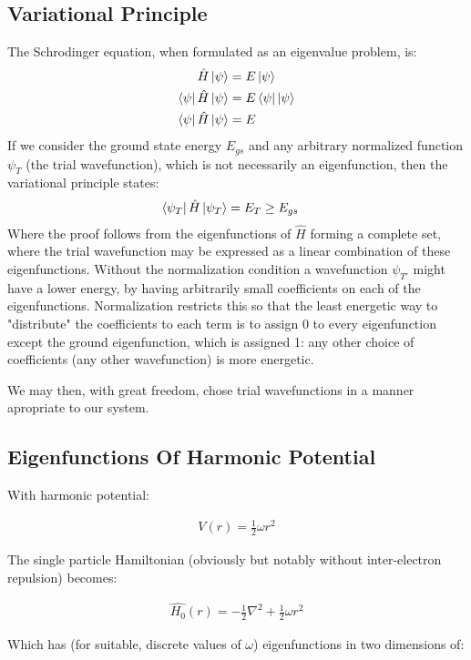 \documentclass[11pt, conference, compsocconf]{IEEEtran}
\begin{document}
\subsection{Variational Principle}
The Schrodinger equation, when formulated as an eigenvalue problem, is:
\begin{align}\hat{H}\ket{\psi} &= E\ket{\psi}\\
\bra{\psi}\hat{H}\ket{\psi} &= E\bra{\psi}\ket{\psi}\\
\bra{\psi}\hat{H}\ket{\psi} &= E
\end{align}
If we consider the ground state energy $E_{gs}$ and any arbitrary normalized function $\psi_{T}$ (the trial wavefunction), which is not necessarily an eigenfunction, then the variational principle states:
\begin{align}\bra{\psi_{T}}\hat{H}\ket{\psi_{T}} &= E_T \geq E_{gs}\end{align}
Where the proof follows from the eigenfunctions of $\hat{H}$ forming a complete set, where the trial wavefunction may be expressed as a linear combination of these eigenfunctions. Without the normalization condition a wavefunction $\psi_{T'}$ might have a lower energy, by having arbitrarily small coefficients on each of the eigenfunctions. Normalization restricts this so that the least energetic way to "distribute" the coefficients to each term is to assign 0 to every eigenfunction except the ground eigenfunction, which is assigned 1: any other choice of coefficients (any other wavefunction) is more energetic.

We may then, with great freedom, chose trial wavefunctions in a manner apropriate to our system.

\subsection{Eigenfunctions Of Harmonic Potential}
With harmonic potential: 

\begin{align}V\left(r\right)=\frac{1}{2}\omega r^2\end{align} 

The single particle Hamiltonian (obviously but notably without inter-electron repulsion) becomes: 

\begin{align}\hat{H_0} \left(r\right)=-\frac{1}{2}\nabla^2 + \frac{1}{2}\omega r^2\end{align}

Which has (for suitable, discrete values of $\omega$) eigenfunctions in two dimensions of:
\end{document}
